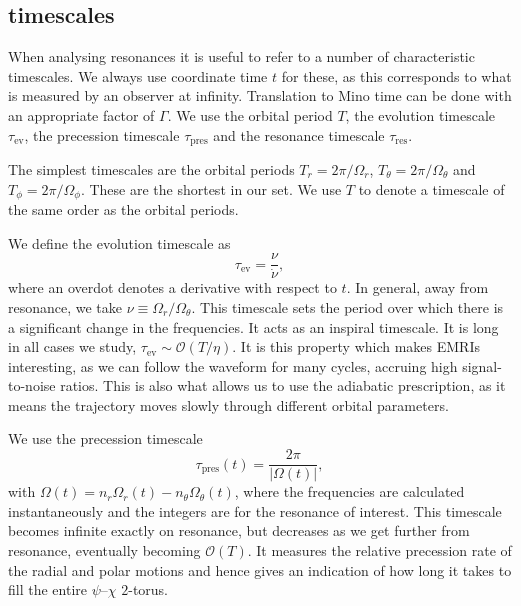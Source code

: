 \documentclass[aps,prd,amsfonts,amssymb,amsmath,nofootinbib,showpacs,superscriptaddress,twocolumn]{revtex4}
\newcommand{\sub}[1]{\ensuremath{_\mathrm{#1}}}
\newcommand{\order}[1]{\ensuremath{\mathcal{O}({#1})}}
\begin{document}
\subsection{timescales}\label{sec:res-time}

When analysing resonances it is useful to refer to a number of characteristic timescales.  We always use coordinate time $t$ for these, as this corresponds to what is measured by an observer at infinity. Translation to Mino time can be done with an appropriate factor of $\Gamma$. We use the orbital period $T$, the evolution timescale $\tau\sub{ev}$, the precession timescale $\tau\sub{pres}$ and the resonance timescale $\tau\sub{res}$.

The simplest timescales are the orbital periods $T_r = 2\pi/\Omega_r$, $T_\theta = 2\pi/\Omega_\theta$ and $T_\phi = 2\pi/\Omega_\phi$. These are the shortest in our set. We use $T$ to denote a timescale of the same order as the orbital periods.

We define the evolution timescale as
\begin{equation}
\tau\sub{ev} = \frac{\nu}{\dot{\nu}},
\end{equation}
where an overdot denotes a derivative with respect to $t$. In general, away from resonance, we take $\nu \equiv \Omega_r/\Omega_\theta$. This timescale sets the period over which there is a significant change in the frequencies. It acts as an inspiral timescale. It is long in all cases we study, $\tau\sub{ev} \sim \order{T/\eta}$. It is this property which makes EMRIs interesting, as we can follow the waveform for many cycles, accruing high signal-to-noise ratios. This is also what allows us to use the adiabatic prescription, as it means the trajectory moves slowly through different orbital parameters.

We use the precession timescale
\begin{equation}
\tau\sub{pres}(t) = \frac{2\pi}{|\Omega(t)|},
\label{eq:t-pres}
\end{equation}
with $\Omega(t) = n_r \Omega_r(t) - n_\theta \Omega_\theta(t)$, where the frequencies are calculated instantaneously and the integers are for the resonance of interest. This timescale becomes infinite exactly on resonance, but decreases as we get further from resonance, eventually becoming $\order{T}$. It measures the relative precession rate of the radial and polar motions and hence gives an indication of how long it takes to fill the entire $\psi$--$\chi$ $2$-torus.
\end{document}
